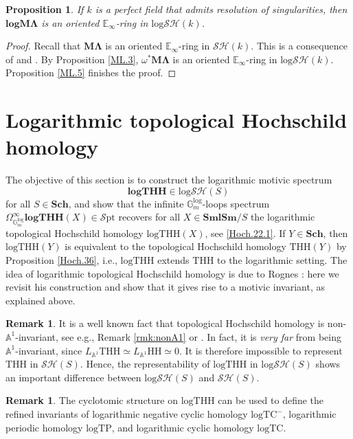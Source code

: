 \documentclass[11pt, a4paper]{amsart}
\newtheorem{prop}[thm]{Proposition}
\theoremstyle{definition}
\newtheorem{rmk}[thm]{Remark}
\numberwithin{equation}{subsection}
\newcommand{\E}{\mathbb{E}}
\newcommand{\A}{\mathbb{A}}
\newcommand{\Sch}{\mathbf{Sch}}
\newcommand{\SmlSm}{\mathbf{SmlSm}}
\newcommand{\spectML}{\mathbf{M\Lambda}}
\newcommand{\THH}{\mathrm{THH}}
\newcommand{\logTHH}{\mathrm{logTHH}}
\newcommand{\spectlogTHH}{\mathbf{logTHH}}
\newcommand{\logTC}{\mathrm{logTC}}
\newcommand{\logTP}{\mathrm{logTP}}
\newcommand{\spectlogML}{\mathbf{logM\Lambda}}
\newcommand{\Gmm}{\mathbb{G}_m^{\mathrm{log}}}
\newcommand{\infSpt}{\mathcal{S}\mathrm{pt}}
\newcommand{\infSH}{\mathcal{SH}}
\newcommand{\inflogSH}{\mathrm{log}\mathcal{SH}}
\begin{document}
\begin{prop}
\label{ML.4}
If $k$ is a perfect field that admits resolution of singularities, 
then $\spectlogML$ is an oriented $\E_\infty$-ring in $\inflogSH(k)$.
\end{prop}
\begin{proof}
Recall that $\spectML$ is an oriented $\E_\infty$-ring in $\infSH(k)$.
This is a consequence of \cite[Theorem 4.1]{MVW} and \cite{zbMATH05827456}.
By Proposition \ref{ML.3}, $\omega^*\spectML$ is an oriented $\E_\infty$-ring in $\inflogSH(k)$.
Proposition \ref{ML.5} finishes the proof.
\end{proof}









\newpage

\section{Logarithmic topological Hochschild homology}
\label{section:lthh}
The objective of this section is to construct the logarithmic motivic spectrum
\[
\spectlogTHH\in \inflogSH(S)
\]
for all $S\in \Sch$, 
and show that the infinite $\Gmm$-loops spectrum $\Omega_{\Gmm}^\infty \spectlogTHH(X)\in \infSpt$ recovers 
for all $X\in \SmlSm/S$ the logarithmic topological Hochschild homology $\logTHH(X)$, 
see \eqref{Hoch.22.1}.
If $Y\in \Sch$, 
then $\logTHH(Y)$ is equivalent to the topological Hochschild homology $\THH(Y)$ by Proposition \ref{Hoch.36},
i.e., 
$\logTHH$ extends $\THH$ to the logarithmic setting. The idea of logarithmic topological Hochschild homology is due to Rognes \cite{RognesLogHH}: here we revisit his construction and show that it gives rise to a motivic invariant, as explained above. 

\begin{rmk}
It is a well known fact that topological Hochschild homology is non-$\A^1$-invariant,
see e.g., Remark \ref{rmk:nonA1} or \cite{EEnonA1}. 
In fact, it is \emph{very far} from being $\A^1$-invariant, 
since $L_{\A^1}\THH \simeq L_{\A^1} \mathrm{HH} \simeq 0$. 
It is therefore impossible to represent $\THH$ in $\infSH(S)$.
Hence, the representability of $\logTHH$ in $\inflogSH(S)$ shows an important difference between $\inflogSH(S)$ and $\infSH(S)$.
\end{rmk}

\begin{rmk} The cyclotomic structure on $\logTHH$ can be used to  define the refined invariants of 
logarithmic negative cyclic homology $\logTC^-$, logarithmic periodic homology $\logTP$, and logarithmic cyclic homology $\logTC$.
\end{rmk}
\end{document}
